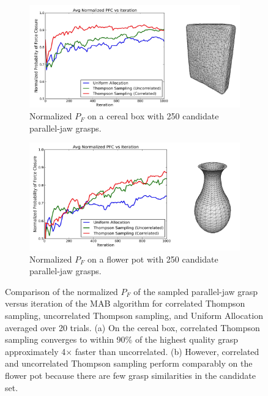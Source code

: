 \begin{figure}[t!]
\centering
	\begin{subfigure}[b]{0.5\textwidth}
        \centering
        \includegraphics[scale=0.08]{figures/box_avg_reward_w_model.jpg}
        \caption{Normalized $P_F$ on a cereal box with 250 candidate parallel-jaw grasps.}
    \end{subfigure}
    \begin{subfigure}[b]{0.5\textwidth}
        \centering
        \includegraphics[scale=0.08]{figures/flowerpot_avg_reward_w_model.jpg}
        \caption{Normalized $P_F$ on a flower pot with 250 candidate parallel-jaw  grasps.}
    \end{subfigure}
\caption{Comparison of the normalized $P_F$ of the sampled parallel-jaw grasp versus iteration of the MAB algorithm for correlated Thompson sampling, uncorrelated Thompson sampling, and Uniform Allocation averaged over 20 trials. (a) On the cereal box, correlated Thompson sampling converges to within 90\% of the highest quality grasp approximately 4$\times$ faster than uncorrelated. (b) However, correlated and uncorrelated Thompson sampling perform comparably on the flower pot because there are few grasp similarities in the candidate set. }
\vspace*{-15pt}
\end{figure}

